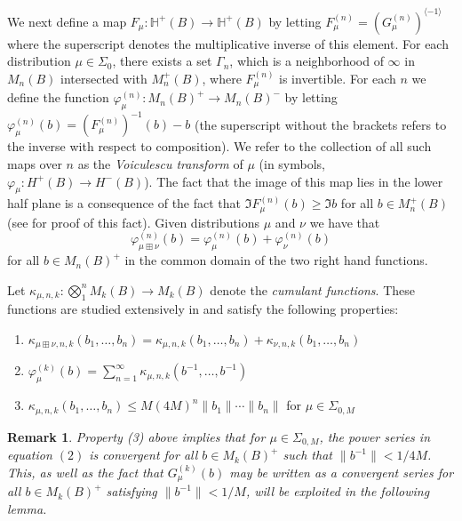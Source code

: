 \documentclass[11pt]{amsart}
\newtheorem{remark}[theorem]{Remark}
\begin{document}
We next define a map $F_{\mu}: \mathbb{H}^{+}(B) \rightarrow \mathbb{H}^{+}(B)$ by letting
$F^{(n)}_{\mu} = (G^{(n)}_{\mu})^{\langle -1 \rangle}$ where the superscript denotes the multiplicative inverse of this element. 
For each distribution $\mu \in \Sigma_{0}$, there exists a set $\Gamma_{n}$, which is a neighborhood of $\infty$  in $M_{n}(B)$ intersected with $M_{n}^{+}(B)$,
where $F^{(n)}_{\mu}$ is invertible.  For each $n$ we define the function $\varphi_{\mu}^{(n)}:M_{n}(B)^{+} \rightarrow M_{n}(B)^{-} $
by letting $\varphi_{\mu}^{(n)}(b) = (F_{\mu}^{(n)})^{-1}(b) - b$ (the superscript without the brackets refers
to the inverse with respect to composition).  We refer to the collection of all such maps
over $n$ as the \textit{Voiculescu transform} of $\mu$ (in symbols, $\varphi_{\mu}: H^{+}(B) \rightarrow H^{-}(B)$).  The fact that the image
of this map lies in the lower half plane is a consequence of the fact that
$\Im F_{\mu}^{(n)}(b) \geq \Im b$ for all $b\in M_{n}^{+}(B)$ (see \cite{PVB} for proof of this fact).  Given distributions
$\mu$ and $\nu$ we have that
$$\varphi^{(n)}_{\mu \boxplus \nu}(b) = \varphi^{(n)}_{\mu}(b) + \varphi^{(n)}_{\nu}(b)$$
for all $b\in M_{n}(B)^{+}$ in the common domain of the two right hand functions.

Let $\kappa_{\mu,n,k}: \bigotimes_{1}^{n} M_{k}(B) \rightarrow M_{k}(B)$ denote the \textit{cumulant functions}.  These functions
are studied extensively in \cite{Speichop} and satisfy the following properties:
\begin{enumerate}
 \item $\kappa_{\mu \boxplus \nu,n,k} (b_{1},\ldots,b_{n}) = \kappa_{\mu,n,k} (b_{1},\ldots,b_{n}) + \kappa_{\nu,n,k} (b_{1},\ldots,b_{n})$

\item $\varphi_{\mu}^{(k)}(b) = \sum_{n=1}^{\infty} \kappa_{\mu,n,k}(b^{-1} , \ldots , b^{-1})$

\item $\kappa_{\mu,n,k}(b_{1},\ldots,b_{n}) \leq M(4M)^{n}\|b_{1} \| \cdots \|b_{n} \|$ for $\mu \in \Sigma_{0,M}$
\end{enumerate}


\begin{remark}\label{domain_remark}
 Property (3) above implies that for $\mu \in \Sigma_{0,M}$, the power series in equation $(2)$ is convergent for all $b\in M_{k}(B)^{+}$ such
that $\|b^{-1} \| < 1/4M$.  This, as well as the fact that $G_{\mu}^{(k)}(b)$ may be written as a convergent series for all $b\in M_{k}(B)^{+}$ satisfying 
$\|b^{-1} \| < 1/M$, will be exploited in the following lemma.

\end{remark}
\end{document}
